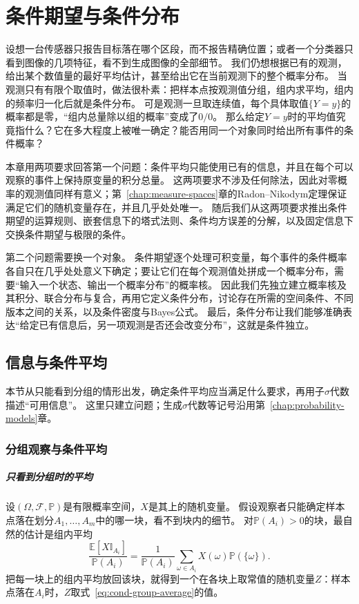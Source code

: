 \chapter{条件期望与条件分布}
\label{chap:conditional-expectation}

设想一台传感器只报告目标落在哪个区段，而不报告精确位置；或者一个分类器只看到图像的几项特征，看不到生成图像的全部细节。
我们仍想根据已有的观测，给出某个数值量的最好平均估计，甚至给出它在当前观测下的整个概率分布。
当观测只有有限个取值时，做法很朴素：把样本点按观测值分组，组内求平均，组内的频率归一化后就是条件分布。
可是观测一旦取连续值，每个具体取值$\{Y=y\}$的概率都是零，“组内总量除以组的概率”变成了$0/0$。
那么给定$Y=y$时的平均值究竟指什么？它在多大程度上被唯一确定？能否用同一个对象同时给出所有事件的条件概率？

本章用两项要求回答第一个问题：条件平均只能使用已有的信息，并且在每个可以观察的事件上保持原变量的积分总量。
这两项要求不涉及任何除法，因此对零概率的观测值同样有意义；第~\ref{chap:measure-spaces}章的Radon--Nikodym定理保证满足它们的随机变量存在，并且几乎处处唯一。
随后我们从这两项要求推出条件期望的运算规则、嵌套信息下的塔式法则、条件均方误差的分解，以及固定信息下交换条件期望与极限的条件。

第二个问题需要换一个对象。
条件期望逐个处理可积变量，每个事件的条件概率各自只在几乎处处意义下确定；要让它们在每个观测值处拼成一个概率分布，需要“输入一个状态、输出一个概率分布”的概率核。
因此我们先独立建立概率核及其积分、联合分布与复合，再用它定义条件分布，讨论存在所需的空间条件、不同版本之间的关系，以及条件密度与Bayes公式。
最后，条件分布让我们能够准确表达“给定已有信息后，另一项观测是否还会改变分布”，这就是条件独立。

\section{信息与条件平均}
\label{sec:cond-information}

本节从只能看到分组的情形出发，确定条件平均应当满足什么要求，再用子$\sigma$代数描述“可用信息”。
这里只建立问题；生成$\sigma$代数等记号沿用第~\ref{chap:probability-models}章。

\subsection{分组观察与条件平均}

\paragraph{只看到分组时的平均}
设$(\Omega,\mathcal F,\mathbb P)$是有限概率空间，$X$是其上的随机变量。
假设观察者只能确定样本点落在划分$A_1,\ldots,A_m$中的哪一块，看不到块内的细节。
对$\mathbb P(A_i)>0$的块，最自然的估计是组内平均
\begin{equation}
  \frac{\mathbb E[X\mathbb I_{A_i}]}{\mathbb P(A_i)}=\frac{1}{\mathbb P(A_i)}\sum_{\omega\in A_i}X(\omega)\mathbb P(\{\omega\}).
  \label{eq:cond-group-average}
\end{equation}
把每一块上的组内平均放回该块，就得到一个在各块上取常值的随机变量$Z$：样本点落在$A_i$时，$Z$取式~\eqref{eq:cond-group-average}的值。

